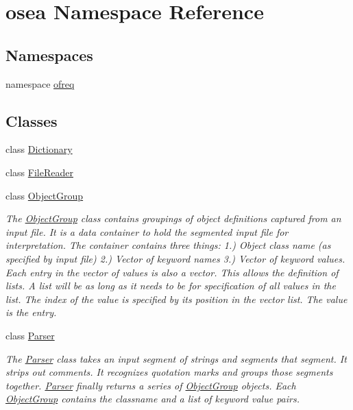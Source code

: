 \hypertarget{namespaceosea}{\section{osea Namespace Reference}
\label{namespaceosea}
}
\subsection*{Namespaces}
\begin{DoxyCompactItemize}
\item 
namespace \hyperlink{namespaceosea_1_1ofreq}{ofreq}
\end{DoxyCompactItemize}
\subsection*{Classes}
\begin{DoxyCompactItemize}
\item 
class \hyperlink{classosea_1_1_dictionary}{Dictionary}
\item 
class \hyperlink{classosea_1_1_file_reader}{File\-Reader}
\item 
class \hyperlink{classosea_1_1_object_group}{Object\-Group}
\begin{DoxyCompactList}\small\item\em The \hyperlink{classosea_1_1_object_group}{Object\-Group} class contains groupings of object definitions captured from an input file. It is a data container to hold the segmented input file for interpretation. The container contains three things\-: 1.) Object class name (as specified by input file) 2.) Vector of keyword names 3.) Vector of keyword values. Each entry in the vector of values is also a vector. This allows the definition of lists. A list will be as long as it needs to be for specification of all values in the list. The index of the value is specified by its position in the vector list. The value is the entry. \end{DoxyCompactList}\item 
class \hyperlink{classosea_1_1_parser}{Parser}
\begin{DoxyCompactList}\small\item\em The \hyperlink{classosea_1_1_parser}{Parser} class takes an input segment of strings and segments that segment. It strips out comments. It recognizes quotation marks and groups those segments together. \hyperlink{classosea_1_1_parser}{Parser} finally returns a series of \hyperlink{classosea_1_1_object_group}{Object\-Group} objects. Each \hyperlink{classosea_1_1_object_group}{Object\-Group} contains the classname and a list of keyword value pairs. \end{DoxyCompactList}\end{DoxyCompactItemize}
